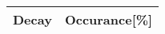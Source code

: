 \documentclass[]{article}
\begin{document}
\begin{center}
    \setlength{\tabcolsep}{9mm} %
    \def\arraystretch{1.25} %
    \centering
    \begin{tabular}{c | c} 
        Decay & Occurance[\%] \\ 
        \hline
        \hline
        
    \end{tabular}
\end{center}
\end{document}
